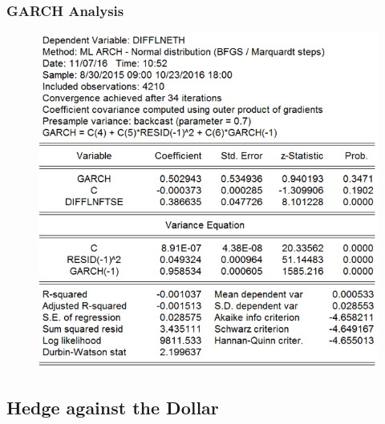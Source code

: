 \documentclass[11pt]{report}
\begin{document}
\subsubsection*{GARCH Analysis}
\begin{figure}[!h]
\centering
\includegraphics[scale=0.6]{Appendix/chap3/5}
\end{figure}
\clearpage
\subsection*{Hedge against the Dollar}
\end{document}
